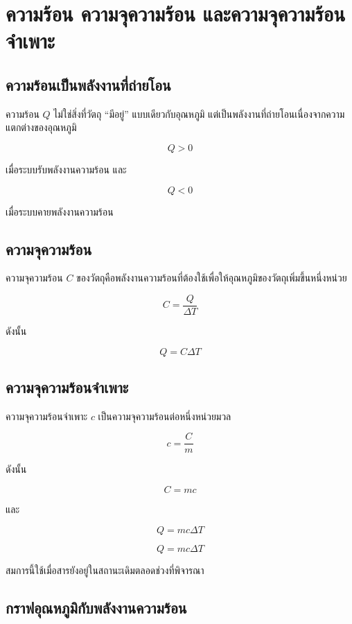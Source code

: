 \section{ความร้อน ความจุความร้อน และความจุความร้อนจำเพาะ}

\subsection{ความร้อนเป็นพลังงานที่ถ่ายโอน}

ความร้อน $Q$ ไม่ใช่สิ่งที่วัตถุ ``มีอยู่'' แบบเดียวกับอุณหภูมิ แต่เป็นพลังงานที่ถ่ายโอนเนื่องจากความแตกต่างของอุณหภูมิ

\[
Q>0
\]

เมื่อระบบรับพลังงานความร้อน และ

\[
Q<0
\]

เมื่อระบบคายพลังงานความร้อน

\subsection{ความจุความร้อน}

ความจุความร้อน $C$ ของวัตถุคือพลังงานความร้อนที่ต้องใช้เพื่อให้อุณหภูมิของวัตถุเพิ่มขึ้นหนึ่งหน่วย

\[
C=\frac{Q}{\Delta T}
\]

ดังนั้น

\[
Q=C\Delta T
\]

\subsection{ความจุความร้อนจำเพาะ}

ความจุความร้อนจำเพาะ $c$ เป็นความจุความร้อนต่อหนึ่งหน่วยมวล

\[
c=\frac{C}{m}
\]

ดังนั้น

\[
C=mc
\]

และ

\[
Q=mc\Delta T
\]

\begin{tcolorbox}[title=ความร้อนที่ทำให้อุณหภูมิเปลี่ยน]
\[
\boxed{Q=mc\Delta T}
\]

สมการนี้ใช้เมื่อสารยังอยู่ในสถานะเดิมตลอดช่วงที่พิจารณา
\end{tcolorbox}

\subsection{กราฟอุณหภูมิกับพลังงานความร้อน}

